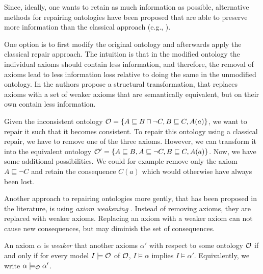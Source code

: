Since, ideally, one wants to retain as much information as possible, alternative methods for repairing ontologies have been proposed that are able to preserve more information than the classical approach (e.g., \cite{du2014practical,AMAI-2018,baader2018making,troquard2018repairing,confalonieri2020towards,horridge2008laconic,lam2008fine}).

One option is to first modify the original ontology and afterwards apply the classical repair approach. The intuition is that in the modified ontology the individual axioms should contain less information, and therefore, the removal of axioms lead to less information loss relative to doing the same in the unmodified ontology. In \cite{horridge2008laconic} the authors propose a structural transformation, that replaces axioms with a set of weaker axioms that are semantically equivalent, but on their own contain less information.

\begin{example}
  Given the inconsistent ontology $\mathcal{O} = \{ A \sqsubseteq B \sqcap \lnot C, B \sqsubseteq C, A(a) \}$, we want to repair it such that it becomes consistent. To repair this ontology using a classical repair, we have to remove one of the three axioms. However, we can transform it into the equivalent ontology $\mathcal{O}' = \{ A \sqsubseteq B, A \sqsubseteq \lnot C, B \sqsubseteq C, A(a) \}$. Now, we have some additional possibilities. We could for example remove only the axiom $A \sqsubseteq \lnot C$ and retain the consequence $C(a)$ which would otherwise have always been lost.
\end{example}

Another approach to repairing ontologies more gently, that has been proposed in the literature, is using \emph{axiom weakening} \cite{troquard2018repairing,confalonieri2020towards,baader2018making,lam2008fine}. Instead of removing axioms, they are replaced with weaker axioms. Replacing an axiom with a weaker axiom can not cause new consequences, but may diminish the set of consequences.

\begin{definition}
  An axiom $\alpha$ is \emph{weaker} that another axioms $\alpha'$ with respect to some ontology $\mathcal{O}$ if and only if for every model $I \models \mathcal{O}$ of $\mathcal{O}$, $I \models \alpha$ implies $I \models \alpha'$. Equivalently, we write $\alpha \models_\mathcal{O} \alpha'$.
\end{definition}

